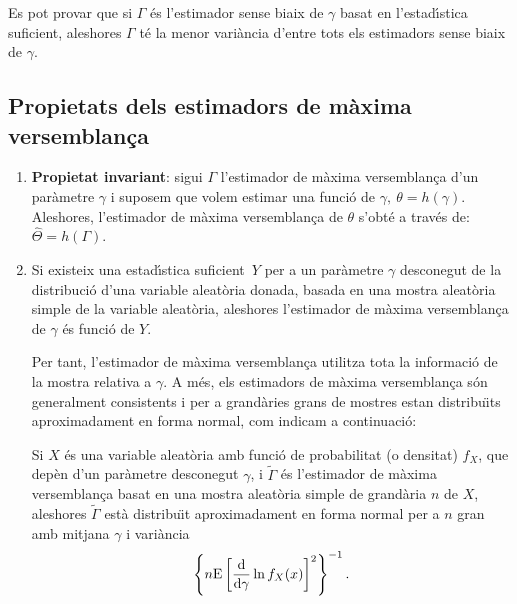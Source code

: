 Es pot provar que si $\Gamma$ \'es l'estimador sense biaix 
de $\gamma$ basat en
l'estad\'{\i}stica suficient, aleshores $\Gamma$ t\'e la menor vari\`ancia d'entre tots
els estimadors sense biaix de $\gamma$.

\subsection{Propietats dels estimadors de m\`axima versemblan\c{c}a}
\begin{enumerate}

\item {\bf Propietat invariant}: sigui $\Gamma$ l'estimador de m\`axima
versemblan\c{c}a d'un par\`ametre $\gamma$ i suposem que volem estimar una funci\'o de
$\gamma, \ \theta = h(\gamma)$. Aleshores, l'estimador de m\`axima versemblan\c{c}a de
$\theta$ s'obt\'e a trav\'es de: $\hat{\Theta} = h(\Gamma)$.

\item Si existeix una estad\'{\i}stica suficient~$Y$ 
per a un par\`ametre $\gamma$
desconegut de la distribuci\'o d'una variable aleat\`oria donada, basada en una
mostra aleat\`oria simple de la variable aleat\`oria, aleshores l'estimador de
m\`axima versemblan\c ca de $\gamma$ \'es funci\'o de $Y$.

Per tant, l'estimador de m\`axima versemblan\c ca utilitza tota la informaci\'o de la
mostra relativa a $\gamma$. A m\'es, els estimadors de m\`axima versemblan\c ca s\'on
generalment consistents 
i per a grand\`aries grans de mostres estan distribu\"{\i}ts
aproximadament en forma normal, com indicam a continuaci\'o:

\begin{proposition}
Si $X$ \'es una variable aleat\`oria amb funci\'o de probabilitat (o
densitat) $f_X$, que dep\`en d'un par\`ametre desconegut $\gamma$, i $\tilde{\Gamma}$
\'es l'estimador de m\`axima versemblan\c ca basat en una mostra aleat\`oria simple de
grand\`aria $n$ de $X$, aleshores $\tilde{\Gamma}$ est\`a distribu\"{\i}t aproximadament en
forma normal per a $n$ gran amb mitjana $\gamma$ i vari\`ancia
$$\left\{ n {\rm E} \left[ {{\rm d} \over {\rm d}\gamma} \ln f_X(x) \right]^2
\right\}^{-1}.$$
\end{proposition}
\end{enumerate}

